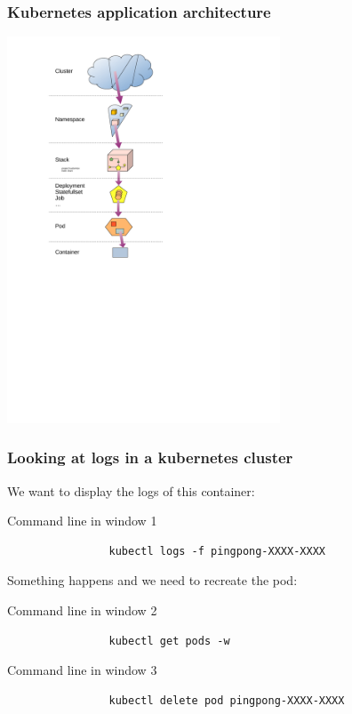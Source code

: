 	\begin{frame}
		\frametitle{Kubernetes application architecture}
		
		\begin{center}
		\includegraphics[height=11.5cm]{../../../resources/color/fromCluster2container.pdf}
		\end{center}
		
	\end{frame}		

	\begin{frame}[fragile]
		\frametitle{Looking at logs in a kubernetes cluster}
	
		We want to display the logs of this container:
		\begin{block}{Command line in window 1}
			\begin{verbatim}
				kubectl logs -f pingpong-XXXX-XXXX
			\end{verbatim}
		\end{block}
		
		Something happens and we need to recreate the pod:
		\begin{block}{Command line in window 2}
			\begin{verbatim}
				kubectl get pods -w
			\end{verbatim}
		\end{block}
		\begin{block}{Command line in window 3}
			\begin{verbatim}
				kubectl delete pod pingpong-XXXX-XXXX
			\end{verbatim}
		\end{block}
	\end{frame}
	
